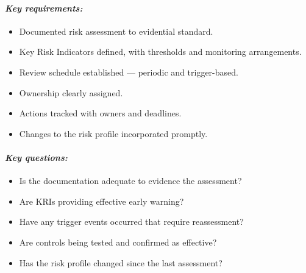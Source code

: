 \paragraph{\textit{Key requirements:}}
\begin{itemize}
  \item{Documented risk assessment to evidential standard.}
  \item{Key Risk Indicators defined, with thresholds and monitoring arrangements.}
  \item{Review schedule established — periodic and trigger-based.}
  \item{Ownership clearly assigned.}
  \item{Actions tracked with owners and deadlines.}
  \item{Changes to the risk profile incorporated promptly.}
\end{itemize}

\paragraph{\textit{Key questions:}}
\begin{itemize}
  \item{Is the documentation adequate to evidence the assessment?}
  \item{Are KRIs providing effective early warning?}
  \item{Have any trigger events occurred that require reassessment?}
  \item{Are controls being tested and confirmed as effective?}
  \item{Has the risk profile changed since the last assessment?}
\end{itemize}
